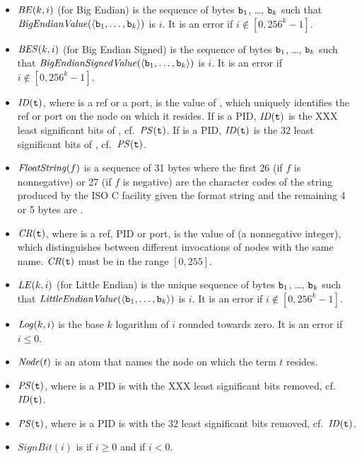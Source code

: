 \begin{itemize}
\item ${\it BE}(k,i)$ (for Big Endian) is the sequence of bytes
${\tt{\sl b}}_1$, \ldots, ${\tt{\sl b}}_k$ such that
${\it BigEndianValue}(\langle{\tt{\sl b}}_1, \ldots, {\tt{\sl b}}_k\rangle)$ is $i$.
It is an error if $i\notin[0,256^k-1]$.
\item ${\it BES}(k,i)$ (for Big Endian Signed) is the sequence of bytes
${\tt{\sl b}}_1$, \ldots, ${\tt{\sl b}}_k$ such that ${\it BigEndianSignedValue}(\langle{\tt{\sl b}}_1, \ldots, {\tt{\sl b}}_k\rangle)$ is $i$.
It is an error if $i\notin[0,256^k-1]$.
\item ${\it ID}({\tt{\sl t}})$, where  is a ref or a port, is the value of
, which uniquely identifies the ref or port on the node on
which it resides.
\ifOld
If  is a PID, ${\it ID}({\tt{\sl t}})$ is the XXX least significant bits
of , cf.\ ${\it PS}({\tt{\sl t}})$.
\fi
\ifStd
If  is a PID, ${\it ID}({\tt{\sl t}})$ is the $32$ least significant
bits of , cf.\ ${\it PS}({\tt{\sl t}})$.
\fi
\item ${\it FloatString}(f)$ is a sequence of 31 bytes where the first 26 (if $f$ is
nonnegative) or 27 (if $f$ is negative) are the character codes of the
string produced by the ISO C  facility given the format
string  and the remaining 4 or 5 bytes are .
\item ${\it CR}({\tt{\sl t}})$, where  is a ref, PID or port, is the value of
 (a nonnegative integer), which distinguishes
between different invocations of nodes with the same name.
${\it CR}({\tt{\sl t}})$ must be in the range $[0,255]$.
\item ${\it LE}(k,i)$ (for Little Endian) is the unique sequence of bytes
${\tt{\sl b}}_1$, \ldots, ${\tt{\sl b}}_k$ such that ${\it LittleEndianValue}(\langle{\tt{\sl b}}_1, \ldots, {\tt{\sl b}}_k\rangle)$
is $i$.  It is an error if $i\notin[0,256^k-1]$.
\item ${\it Log}(k,i)$ is the base $k$ logarithm of $i$ rounded towards zero.
It is an error if $i\leq 0$.
\item ${\it Node}(t)$ is an atom that names the node on which the term $t$ resides.
\ifOld
\item ${\it PS}({\tt{\sl t}})$, where  is a PID is  with the XXX least
significant bits removed, cf.\ ${\it ID}({\tt{\sl t}})$.
\fi
\ifStd
\item ${\it PS}({\tt{\sl t}})$, where  is a PID is  with the $32$ least
significant bits removed, cf.\ ${\it ID}({\tt{\sl t}})$.
\fi
\item $SignBit(i)$ is  if $i\geq 0$ and  if $i<0$.
\end{itemize}

